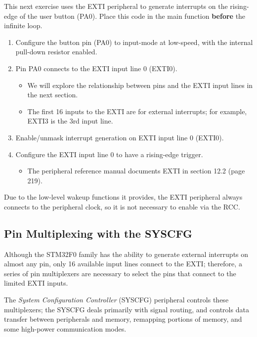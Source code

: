 \documentclass[11pt,fleqn]{book} %
\begin{document}
\begin{exercise}
    \label{ex2}
   This next exercise uses the EXTI peripheral to generate interrupts on the rising-edge of the user button (PA0). Place this code in the main function \textbf{before} the infinite loop. 
    \begin{enumerate}
        \item Configure the button pin (PA0) to input-mode at low-speed, with the internal pull-down resistor enabled. 
        \item Pin PA0 connects to the EXTI input line 0 (EXTI0). 
        \begin{itemize}
            \item We will explore the relationship between pins and the EXTI input lines in the next section. 
            \item The first 16 inputs to the EXTI are for external interrupts; for example, EXTI3 is the 3rd input line.
        \end{itemize}
        \item Enable/unmask interrupt generation on EXTI input line 0 (EXTI0).
        \item Configure the EXTI input line 0 to have a rising-edge trigger.
        \begin{itemize}
            \item The peripheral reference manual documents EXTI in section 12.2 (page 219).
        \end{itemize}
    \end{enumerate}

    \noindent Due to the low-level wakeup functions it provides, the EXTI peripheral always connects to the peripheral clock, so it is not necessary to enable via the RCC.   
\end{exercise}



\subsection{Pin Multiplexing with the SYSCFG} \label{syscfg}
Although the STM32F0 family has the ability to generate external interrupts on almost any pin, only 16 available input lines connect to the EXTI; therefore, a series of pin multiplexers are necessary to select the pins that connect to the limited EXTI inputs.  

The \textit{System Configuration Controller} (SYSCFG) peripheral controls these multiplexers; the SYSCFG deals primarily with signal routing, and controls data transfer between peripherals and memory, remapping portions of memory, and some high-power communication modes. 
\end{document}

